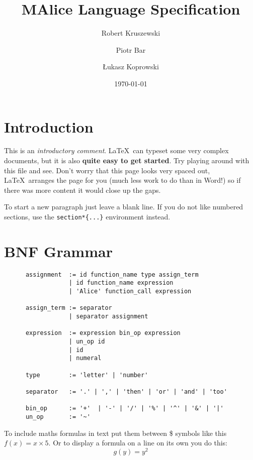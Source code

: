 \documentclass[a4wide, 11pt]{article}
\begin{document}
\title{MAlice Language Specification}

\author{Robert Kruszewski \and Piotr Bar \and Łukasz Koprowski}


\date{\today}         %

\maketitle            %

\section{Introduction}

This is an \emph{introductory comment}.
\LaTeX\ can typeset some very complex documents, but it is also
\textbf{quite easy to get started}.
Try playing around with this file and see. 
Don't worry that this page looks very spaced out,
\LaTeX\ arranges the page for you (much less work to do than in Word!)
so if there was more content it would close up the gaps.

To start a new paragraph just leave a blank line.
If you do not like numbered sections, use the \texttt{section*\{...\}}
environment instead.

\section{BNF Grammar} 

\begin{verbatim}
      assignment  := id function_name type assign_term
                  | id function_name expression 
                  | 'Alice' function_call expression

      assign_term := separator
                  | separator assignment

      expression  := expression bin_op expression 
                  | un_op id
                  | id
                  | numeral

      type        := 'letter' | 'number'

      separator   := '.' | ',' | 'then' | 'or' | 'and' | 'too'

      bin_op      := '+'  | '-' | '/' | '%' | '^' | '&' | '|'
      un_op       := '~'
\end{verbatim}

To include maths formulas in text put them between \$ symbols like this
$f(x) = x \times 5$.
Or to display a formula on a line on its own you do this:
\[
    g(y) = y^2
\]
\end{document}

